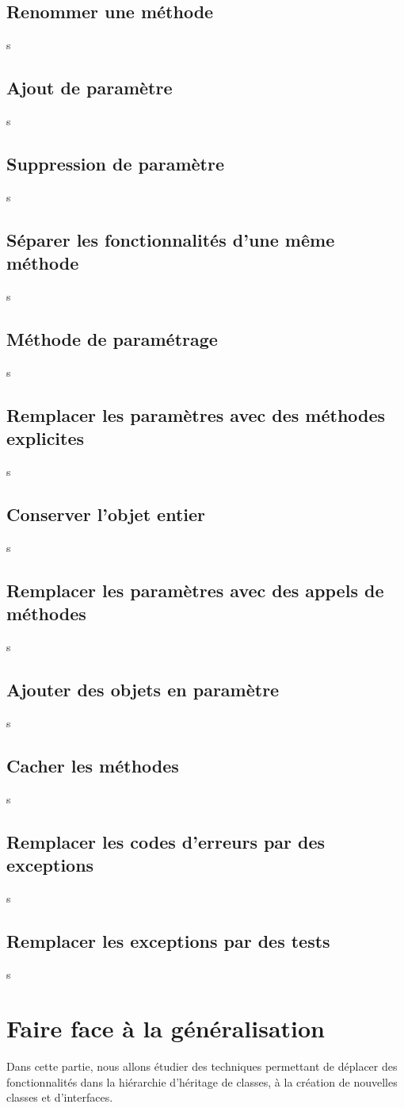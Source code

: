\documentclass[a4paper,twoside,12pt,openright]{report}
\begin{document}
\subsection{Renommer une méthode}
s
\subsection{Ajout de paramètre}
s
\subsection{Suppression de paramètre}
s
\subsection{Séparer les fonctionnalités d'une même méthode}
s
\subsection{Méthode de paramétrage}
s
\subsection{Remplacer les paramètres avec des méthodes explicites}
s
\subsection{Conserver l'objet entier}
s
\subsection{Remplacer les paramètres avec des appels de méthodes}
s
\subsection{Ajouter des objets en paramètre}
s
\subsection{Cacher les méthodes}
s
\subsection{Remplacer les codes d'erreurs par des exceptions}
s
\subsection{Remplacer les exceptions par des tests}
s


\newpage
\section{Faire face à la généralisation}
Dans cette partie, nous allons étudier des techniques permettant de déplacer des fonctionnalités dans la hiérarchie d'héritage de classes, à la création de nouvelles classes et d'interfaces.
\end{document}
